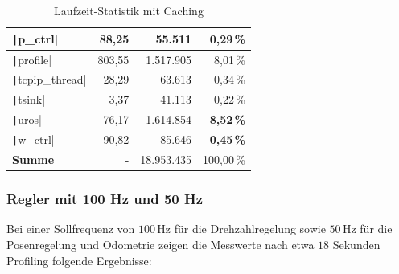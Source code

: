 \begin{table}[H]
{{\begin{minipage}[b]{0.50\hsize}
\begin{tabular}{|l|r|r|r|}
        \texttt|p_ctrl| & 88,25 & 55.511 & \textbf{0,29\,\%} \\ \hline
        \texttt|profile| & 803,55 & 1.517.905 & 8,01\,\% \\ \hline
        \texttt|tcpip_thread| & 28,29 & 63.613 & 0,34\,\% \\ \hline
        \texttt|tsink| & 3,37 & 41.113 & 0,22\,\% \\ \hline
        \texttt|uros| & 76,17 & 1.614.854 & \textbf{8,52\,\%} \\ \hline
        \texttt|w_ctrl| & 90,82 & 85.646 & \textbf{0,45\,\%} \\ \hline
        \hline
        \textbf{Summe} & - & 18.953.435 & 100,00\,\% \\ \hline
        \end{tabular}
        \caption{Laufzeit-Statistik mit Caching}
    \end{minipage}
}}
\end{table}

\subsubsection{Regler mit 100 Hz und 50 Hz}

Bei einer Sollfrequenz von $100\,\text{Hz}$ für die Drehzahlregelung sowie
$50\,\text{Hz}$ für die Posenregelung und Odometrie zeigen die Messwerte nach
etwa $18$ Sekunden Profiling folgende Ergebnisse:

